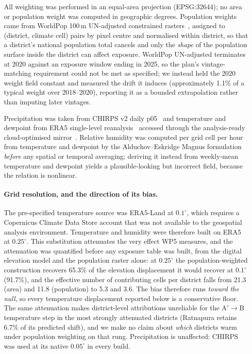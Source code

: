 All weighting was performed in an equal-area projection (EPSG:32644); no area or population weight was computed in geographic degrees. Population weights came from WorldPop 100\,m UN-adjusted constrained rasters~\cite{Tatem2017,WorldPop2025}, assigned to (district, climate cell) pairs by pixel centre and normalised within district, so that a district's national population total cancels and only the \emph{shape} of the population surface inside the district can affect exposure. WorldPop UN-adjusted terminates at 2020 against an exposure window ending in 2025, so the plan's vintage-matching requirement could not be met as specified; we instead held the 2020 weight field constant and measured the drift it induces (approximately 1.1\% of a typical weight over 2018--2020), reporting it as a bounded extrapolation rather than imputing later vintages.

Precipitation was taken from CHIRPS v2 daily p05~\cite{Funk2015,CHIRPS} and temperature and dewpoint from ERA5 single-level reanalysis~\cite{Hersbach2020} accessed through the analysis-ready cloud-optimised mirror~\cite{Carver2023ARCO}. Relative humidity was computed per grid cell per hour from temperature and dewpoint by the Alduchov--Eskridge Magnus formulation~\cite{AlduchovEskridge1996} \emph{before} any spatial or temporal averaging; deriving it instead from weekly-mean temperature and dewpoint yields a plausible-looking but incorrect field, because the relation is nonlinear.

\paragraph{Grid resolution, and the direction of its bias.} The pre-specified temperature source was ERA5-Land at $0.1^{\circ}$, which requires a Copernicus Climate Data Store account that was not available to the geospatial analysis environment. Temperature and humidity were therefore built on ERA5 at $0.25^{\circ}$. This substitution attenuates the very effect WP5 measures, and the attenuation was quantified before any exposure table was built, from the digital elevation model and the population raster alone: at $0.25^{\circ}$ the population-weighted construction recovers 65.3\% of the elevation displacement it would recover at $0.1^{\circ}$ (91.7\%), and the effective number of contributing cells per district falls from 21.3 (area) and 11.8 (population) to 5.3 and 3.6. The bias therefore runs \emph{toward the null}, so every temperature displacement reported below is a conservative floor. The same attenuation makes district-level attributions unreliable for the A$'\to$B temperature step in the most strongly attenuated districts (Ratnapura retains 6.7\% of its predicted shift), and we make no claim about \emph{which} districts warm under population weighting on that rung. Precipitation is unaffected: CHIRPS was used at its native $0.05^{\circ}$ in every build.

